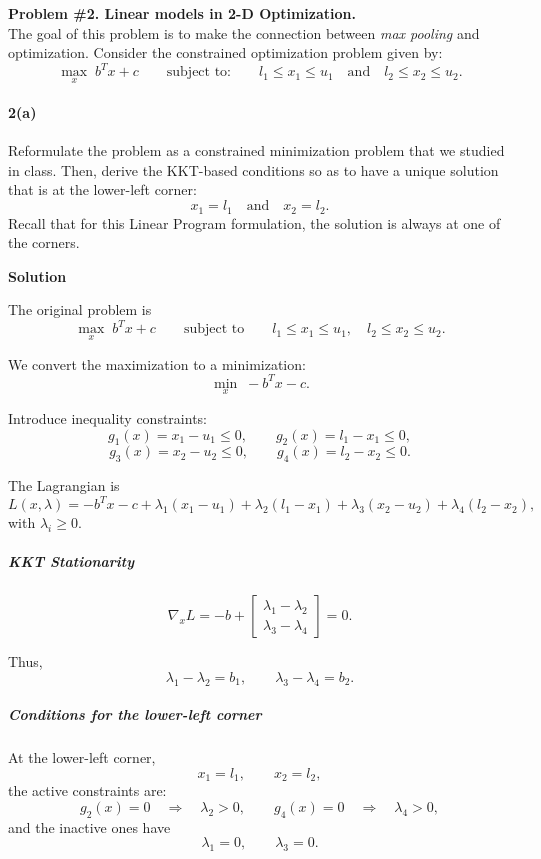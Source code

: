 \documentclass[11pt]{article}
\begin{document}
	\newpage
	
	\noindent\textbf{Problem \#2. Linear models in 2-D Optimization.} \\
	The goal of this problem is to make the connection between \textit{max pooling} and optimization.  
	Consider the constrained optimization problem given by:
	\[
	\max_{x} \; b^T x + c \qquad \text{subject to:} \qquad l_1 \le x_1 \le u_1 \quad \text{and} \quad l_2 \le x_2 \le u_2. \tag{1}
	\]
	
	\paragraph{2(a)}  
	Reformulate the problem as a constrained minimization problem that we studied in class.  
	Then, derive the KKT-based conditions so as to have a unique solution that is at the lower-left corner:  
	\[
	x_1 = l_1 \quad \text{and} \quad x_2 = l_2.
	\]
	Recall that for this Linear Program formulation, the solution is always at one of the corners.
	
	\noindent\textbf{Solution}
	
	The original problem is
	\[
	\max_{x} \; b^T x + c
	\qquad \text{subject to} \qquad
	l_1 \le x_1 \le u_1,\quad l_2 \le x_2 \le u_2.
	\]
	
	We convert the maximization to a minimization:
	\[
	\min_{x} \; -b^T x - c.
	\]
	
	Introduce inequality constraints:
	\[
	g_1(x) = x_1 - u_1 \le 0, \qquad
	g_2(x) = l_1 - x_1 \le 0,
	\]
	\[
	g_3(x) = x_2 - u_2 \le 0, \qquad
	g_4(x) = l_2 - x_2 \le 0.
	\]
	
	The Lagrangian is
	\[
	L(x,\lambda) = -b^T x - c
	+ \lambda_1(x_1 - u_1)
	+ \lambda_2(l_1 - x_1)
	+ \lambda_3(x_2 - u_2)
	+ \lambda_4(l_2 - x_2),
	\]
	with $\lambda_i \ge 0$.
	
	\subparagraph*{KKT Stationarity}
	\[
	\nabla_x L = -b +
	\begin{bmatrix}
		\lambda_1 - \lambda_2 \\
		\lambda_3 - \lambda_4
	\end{bmatrix}
	= 0.
	\]
	
	Thus,
	\[
	\lambda_1 - \lambda_2 = b_1, \qquad
	\lambda_3 - \lambda_4 = b_2.
	\]
	
	\subparagraph*{Conditions for the lower-left corner}
	At the lower-left corner,
	\[
	x_1 = l_1, \qquad x_2 = l_2,
	\]
	the active constraints are:
	\[
	g_2(x) = 0 \quad \Rightarrow \quad \lambda_2 > 0, \qquad
	g_4(x) = 0 \quad \Rightarrow \quad \lambda_4 > 0,
	\]
	and the inactive ones have
	\[
	\lambda_1 = 0, \qquad \lambda_3 = 0.
	\]
	
\end{document}
